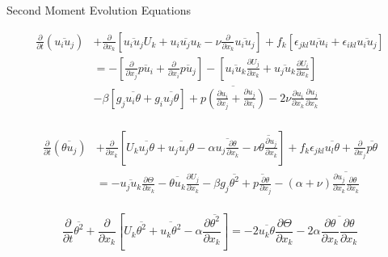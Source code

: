 \documentclass[landscape]{seminar}
\newcommand{\pdiff}[2]{\frac{\partial #1}{\partial #2}}
\begin{document}
\begin{slide}

\begin{center}
Second Moment Evolution Equations
\end{center}

\footnotesize

\[
\begin{split}
\pdiff{}{t}(\overline{u_i u_j}) &+ \pdiff{}{x_k}\left[\overline{u_i u_j} U_k + \overline{u_i u_j u_k} - \nu \pdiff{}{x_k}\overline{u_i u_j}\right] + f_k \left[\epsilon_{j k l} \overline{u_l u_i} + \epsilon_{i k l} \overline{u_i u_j} \right]\\
   & = - \left[\pdiff{}{x_j} \overline{p u_i} + \pdiff{}{x_i} \overline{p u_j} \right] - \left[\overline{u_i u_k} \pdiff{U_j}{x_k} + \overline{u_j u_k} \pdiff{U_i}{x_k} \right] \\
   & - \beta \left[g_j \overline{u_i \theta} + g_i \overline{u_j \theta} \right] + \overline{p \left( \pdiff{u_i}{x_j} + \pdiff{u_j}{x_i}\right)} - 2 \nu \pdiff{u_i}{x_k} \pdiff{u_j}{x_k}\\
\end{split}
\]

\[
\begin{split}
\pdiff{}{t}(\overline{\theta u_j}) &+ \pdiff{}{x_k} \left[U_k \overline{u_j \theta} + \overline{u_j u_j \theta} - \alpha \overline{u_j \pdiff{\theta}{x_k}} - \nu \overline{\theta \pdiff{u_j}{x_k}} \right] + f_k \epsilon_{jkl}\overline{u_l \theta} + \pdiff{}{x_j}\overline{p \theta}\\
  &  = - \overline{u_j u_k} \pdiff{\Theta}{x_k} - \overline{\theta u_k} \pdiff{U_j}{x_k} - \beta g_j \overline{\theta^2} + \overline{p \pdiff{\theta}{x_j}} - (\alpha + \nu) \overline{\pdiff{u_j}{x_k}\pdiff{\theta}{x_k}} \\
\end{split}
\]

\[
\pdiff{}{t}\overline{\theta^2} + \pdiff{}{x_k} \left[U_k \overline{\theta^2} + \overline{u_k \theta^2} - \alpha \pdiff{\overline{\theta^2}}{x_k} \right] = - 2 \overline{u_k \theta} \pdiff{\Theta}{x_k} - 2 \alpha \overline{\pdiff{\theta}{x_k} \pdiff{\theta}{x_k}}
\]

\normalsize

\end{slide}
\end{document}
